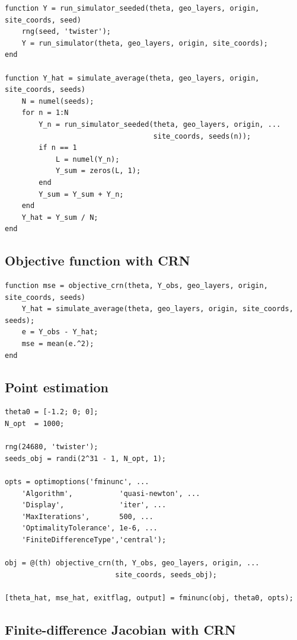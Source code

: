 \documentclass[11pt]{article}
\begin{document}
\begin{lstlisting}
function Y = run_simulator_seeded(theta, geo_layers, origin, site_coords, seed)
    rng(seed, 'twister');
    Y = run_simulator(theta, geo_layers, origin, site_coords);
end

function Y_hat = simulate_average(theta, geo_layers, origin, site_coords, seeds)
    N = numel(seeds);
    for n = 1:N
        Y_n = run_simulator_seeded(theta, geo_layers, origin, ...
                                   site_coords, seeds(n));
        if n == 1
            L = numel(Y_n);
            Y_sum = zeros(L, 1);
        end
        Y_sum = Y_sum + Y_n;
    end
    Y_hat = Y_sum / N;
end
\end{lstlisting}

\subsection{Objective function with CRN}

\begin{lstlisting}
function mse = objective_crn(theta, Y_obs, geo_layers, origin, site_coords, seeds)
    Y_hat = simulate_average(theta, geo_layers, origin, site_coords, seeds);
    e = Y_obs - Y_hat;
    mse = mean(e.^2);
end
\end{lstlisting}

\subsection{Point estimation}

\begin{lstlisting}
theta0 = [-1.2; 0; 0];
N_opt  = 1000;

rng(24680, 'twister');
seeds_obj = randi(2^31 - 1, N_opt, 1);

opts = optimoptions('fminunc', ...
    'Algorithm',           'quasi-newton', ...
    'Display',             'iter', ...
    'MaxIterations',       500, ...
    'OptimalityTolerance', 1e-6, ...
    'FiniteDifferenceType','central');

obj = @(th) objective_crn(th, Y_obs, geo_layers, origin, ...
                          site_coords, seeds_obj);

[theta_hat, mse_hat, exitflag, output] = fminunc(obj, theta0, opts);
\end{lstlisting}

\subsection{Finite-difference Jacobian with CRN}
\end{document}
